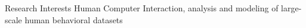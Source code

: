 
\begin{rSection}{Research Interests}
Human Computer Interaction, analysis and modeling of large-scale human behavioral datasets
\end{rSection}
